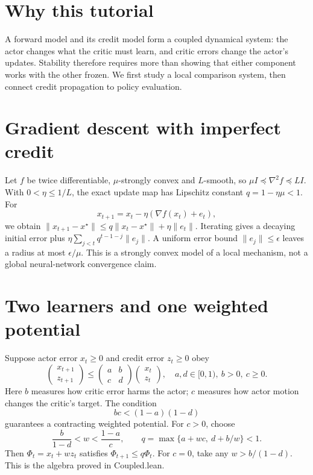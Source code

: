 \documentclass[11pt]{article}
\begin{document}
\section*{Why this tutorial}
A forward model and its credit model form a coupled dynamical system: the actor changes what the critic must learn, and critic errors change the actor's updates. Stability therefore requires more than showing that either component works with the other frozen. We first study a local comparison system, then connect credit propagation to policy evaluation.
\section{Gradient descent with imperfect credit}
Let $f$ be twice differentiable, $\mu$-strongly convex and $L$-smooth, so $\mu I\preceq\nabla^2f\preceq LI$. With $0<\eta\le1/L$, the exact update map has Lipschitz constant $q=1-\eta\mu<1$. For
\[
 x_{t+1}=x_t-\eta(\nabla f(x_t)+e_t),
\]
we obtain $\|x_{t+1}-x^\star\|\le q\|x_t-x^\star\|+\eta\|e_t\|$. Iterating gives a decaying initial error plus $\eta\sum_{j<t}q^{t-1-j}\|e_j\|$. A uniform error bound $\|e_j\|\le\epsilon$ leaves a radius at most $\epsilon/\mu$. This is a strongly convex model of a local mechanism, not a global neural-network convergence claim.
\section{Two learners and one weighted potential}
Suppose actor error $x_t\ge0$ and credit error $z_t\ge0$ obey
\[
 \begin{pmatrix}x_{t+1}\\z_{t+1}\end{pmatrix}
 \le \begin{pmatrix}a&b\\c&d\end{pmatrix}
 \begin{pmatrix}x_t\\z_t\end{pmatrix},
 \quad a,d\in[0,1),\ b>0,\ c\ge0.
\]
Here $b$ measures how critic error harms the actor; $c$ measures how actor motion changes the critic's target. The condition
\[
 bc<(1-a)(1-d)
\]
guarantees a contracting weighted potential. For $c>0$, choose
\[
 \frac{b}{1-d}<w<\frac{1-a}{c},\qquad
 q=\max\{a+wc,\ d+b/w\}<1.
\]
Then $\Phi_t=x_t+wz_t$ satisfies $\Phi_{t+1}\le q\Phi_t$. For $c=0$, take any $w>b/(1-d)$. This is the algebra proved in Coupled.lean.
\end{document}
